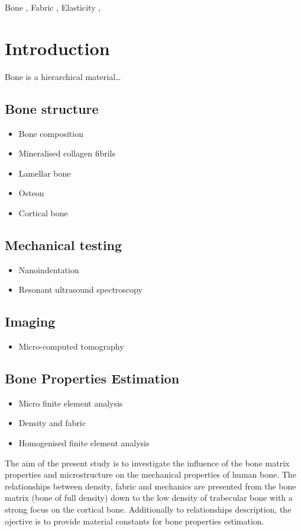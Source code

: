 \documentclass[a4paper,fleqn]{DC_ArtStyle}
\begin{document}
	\begin{keywords}
		Bone \sep%
		Fabric \sep%
		Elasticity \sep%
	\end{keywords}
	

	\begin{NoHyper}
		\maketitle
	\end{NoHyper}
	
	
	\section{Introduction}
	Bone is a hierarchical material\dots
	\subsection{Bone structure}
	\begin{itemize}
		\item Bone composition
		\item Mineralised collagen fibrils
		\item Lamellar bone
		\item Osteon
		\item Cortical bone
	\end{itemize}
	\subsection{Mechanical testing}
	\begin{itemize}
		\item Nanoindentation
		\item Resonant ultrasound spectroscopy
	\end{itemize}
	\subsection{Imaging}
	\begin{itemize}
		\item Micro-computed tomography
	\end{itemize}
	\subsection{Bone Properties Estimation}
	\begin{itemize}
		\item Micro finite element analysis
		\item Density and fabric
		\item Homogenised finite element analysis
	\end{itemize}
	The aim of the present study is to investigate the influence of the bone matrix properties and microstructure on the mechanical properties of human bone.
	The relationships between density, fabric and mechanics are presented from the bone matrix (bone of full density) down to the low density of trabecular bone with a strong focus on the cortical bone.
	Additionally to relationships description, the ojective is to provide material constants for bone properties estimation.
\end{document}

